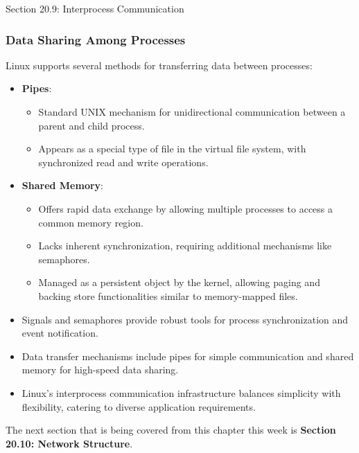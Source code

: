 \begin{notes}{Section 20.9: Interprocess Communication}
    \subsubsection*{Data Sharing Among Processes}
    
    Linux supports several methods for transferring data between processes:
    \begin{itemize}
        \item \textbf{Pipes}:
        \begin{itemize}
            \item Standard UNIX mechanism for unidirectional communication between a parent and child process.
            \item Appears as a special type of file in the virtual file system, with synchronized read and write operations.
        \end{itemize}
        \item \textbf{Shared Memory}:
        \begin{itemize}
            \item Offers rapid data exchange by allowing multiple processes to access a common memory region.
            \item Lacks inherent synchronization, requiring additional mechanisms like semaphores.
            \item Managed as a persistent object by the kernel, allowing paging and backing store functionalities similar to memory-mapped files.
        \end{itemize}
    \end{itemize}
    
    \begin{highlight}
        \begin{itemize}
            \item Signals and semaphores provide robust tools for process synchronization and event notification.
            \item Data transfer mechanisms include pipes for simple communication and shared memory for high-speed data sharing.
            \item Linux's interprocess communication infrastructure balances simplicity with flexibility, catering to diverse application requirements.
        \end{itemize}
    \end{highlight}
\end{notes}

The next section that is being covered from this chapter this week is \textbf{Section 20.10: Network Structure}.

